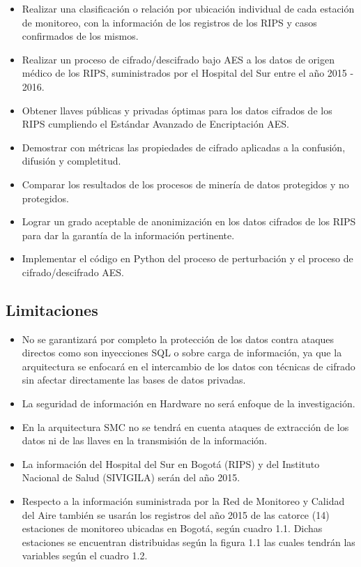 \documentclass[a4paper,openright,12pt]{book}
\theoremstyle{definition}
\theoremstyle{remark}
\begin{document}
\begin{itemize}
\item Realizar una clasificación o relación por ubicación individual de cada estación de monitoreo, con la información de los registros de los RIPS y casos confirmados de los mismos.
\item Realizar un proceso de cifrado/descifrado bajo AES a los datos de origen médico de los RIPS, suministrados por el Hospital del Sur entre el año 2015 - 2016.
\item Obtener llaves públicas y privadas óptimas para los datos cifrados de los RIPS cumpliendo el Estándar Avanzado de Encriptación AES.
\item Demostrar con métricas las propiedades de cifrado aplicadas a la confusión, difusión y completitud.
\item Comparar los resultados de los procesos de minería de datos protegidos y no protegidos.
\item Lograr un grado aceptable de anonimización en los datos cifrados de los RIPS para dar la garantía de la información pertinente.
\item Implementar  el código en Python del proceso de perturbación y el proceso de cifrado/descifrado AES.
\end{itemize}

\subsection{Limitaciones}

\begin{itemize}
\item No se garantizará por completo la protección de los datos contra ataques directos como son inyecciones SQL o sobre carga de información, ya que la arquitectura se enfocará en el intercambio de los datos con técnicas de cifrado sin afectar directamente las bases de datos privadas. 
\item La seguridad de información en Hardware no será enfoque de la investigación.
\item En la arquitectura SMC no se tendrá en cuenta ataques de extracción de los datos ni de las llaves en la transmisión de la información.
\item La información del Hospital del Sur en Bogotá (RIPS) y del Instituto Nacional de Salud (SIVIGILA) serán del año 2015.
\item Respecto a la información suministrada por la Red de Monitoreo y Calidad del Aire también se usarán los registros del año 2015 de las catorce (14) estaciones de monitoreo ubicadas en Bogotá, según cuadro 1.1. Dichas estaciones se encuentran distribuidas según la figura 1.1 las cuales tendrán las variables según el cuadro 1.2.
\end{itemize}
\end{document}
